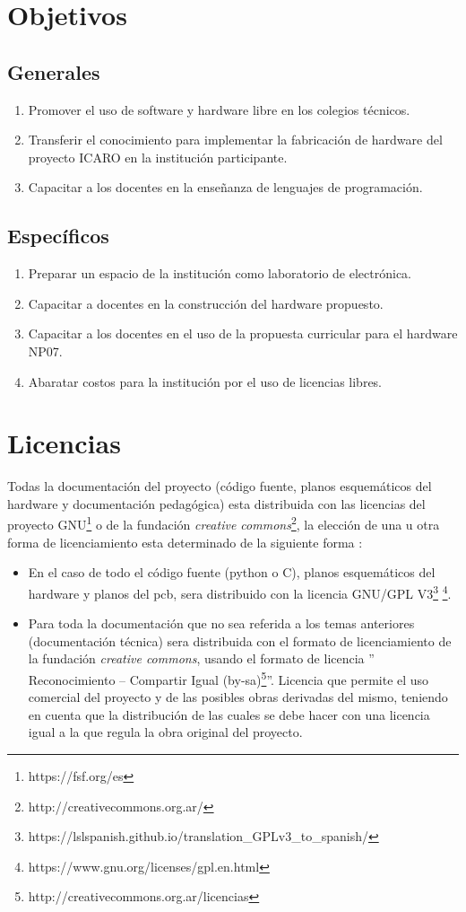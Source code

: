 \section{Objetivos}
\subsection*{Generales}
\begin{enumerate}
  \item Promover el uso de software y hardware libre en los colegios técnicos.
  \item Transferir el conocimiento para implementar la fabricación de hardware del proyecto ICARO en la institución participante.
  \item Capacitar a los docentes en la enseñanza de lenguajes de programación.
\end{enumerate}
\subsection*{Específicos}
\begin{enumerate}
  \item Preparar un espacio de la institución como laboratorio de electrónica.
  \item Capacitar a docentes en la construcción del hardware propuesto.
  \item Capacitar a los docentes en el uso de la propuesta curricular para el hardware NP07.
  \item Abaratar costos para la institución por el uso de licencias libres.

\end{enumerate}

\section{Licencias}
Todas la documentación del proyecto (código fuente, planos esquemáticos del hardware y documentación pedagógica) esta distribuida con las licencias del proyecto GNU\footnote{https://fsf.org/es}  o de la fundación \textit{creative commons}\footnote{http://creativecommons.org.ar/}, la elección de una u otra forma de licenciamiento esta determinado de la siguiente forma \citep{bareno2011metodologia}:
\begin{itemize}
  \item En el caso de todo el  código fuente (python o C), planos esquemáticos del hardware y planos del pcb, sera distribuido con la licencia GNU/GPL V3\footnote{https://lslspanish.github.io/translation\_GPLv3\_to\_spanish/} \footnote{https://www.gnu.org/licenses/gpl.en.html}.
  \item Para toda la documentación que no sea referida a los temas anteriores (documentación técnica) sera distribuida con el formato de licenciamiento de la fundación \textit{creative commons}, usando el formato de licencia '' Reconocimiento – Compartir Igual (by-sa)\footnote{http://creativecommons.org.ar/licencias}''.  Licencia que permite el uso comercial del proyecto y de las posibles obras derivadas del mismo, teniendo en cuenta que la distribución de las cuales se debe hacer con una licencia igual a la que regula la obra original del proyecto.
\end{itemize}

